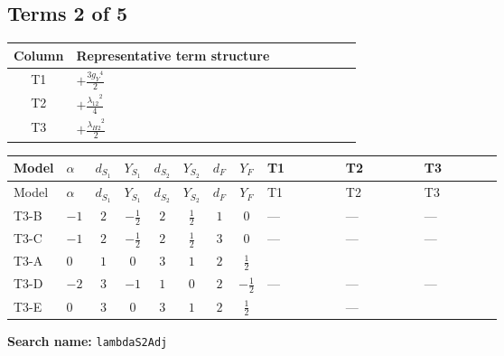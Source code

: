 \documentclass[8pt]{article}
\begin{document}
\begin{landscape}
\subsection*{Terms 2 of 5}
\begin{center}
\begin{tabular}{@{}c >{\raggedright\arraybackslash}p{0.82\linewidth}@{}}
\toprule
Column & Representative term structure \\
\midrule
T1 & \(\displaystyle +\frac{3 {g_Y}^4}{2}\) \\
\midrule
T2 & \(\displaystyle +\frac{{\lambda_{12}}^2}{4}\) \\
\midrule
T3 & \(\displaystyle +\frac{{\lambda_{H2}}^2}{2}\) \\
\midrule
\bottomrule
\end{tabular}
\end{center}
\smallskip
\tiny
\begin{longtable}{@{}llcccccc >{\raggedright\arraybackslash}p{0.21\linewidth} >{\raggedright\arraybackslash}p{0.21\linewidth} >{\raggedright\arraybackslash}p{0.21\linewidth}@{}}
\toprule
Model & $\alpha$ & $d_{S_1}$ & $Y_{S_1}$ & $d_{S_2}$ & $Y_{S_2}$ & $d_F$ & $Y_F$ & T1 & T2 & T3 \\
\midrule
\endfirsthead
\toprule
Model & $\alpha$ & $d_{S_1}$ & $Y_{S_1}$ & $d_{S_2}$ & $Y_{S_2}$ & $d_F$ & $Y_F$ & T1 & T2 & T3 \\
\midrule
\endhead
T3-B & $-1$ & $2$ & $-\frac{1}{2}$ & $2$ & $\frac{1}{2}$ & $1$ & $0$ & --- & --- & --- \\
\midrule
T3-C & $-1$ & $2$ & $-\frac{1}{2}$ & $2$ & $\frac{1}{2}$ & $3$ & $0$ & --- & --- & --- \\
\midrule
T3-A & $0$ & $1$ & $0$ & $3$ & $1$ & $2$ & $\frac{1}{2}$ & \scriptsize\adjustbox{max width=\linewidth}{$\begin{gathered} +\frac{3 {g_Y}^4}{2}\end{gathered}$} & \scriptsize\adjustbox{max width=\linewidth}{$\begin{gathered} +\frac{{\lambda_{12}}^2}{4}\end{gathered}$} & \scriptsize\adjustbox{max width=\linewidth}{$\begin{gathered} +\frac{{\lambda_{H2}}^2}{2}\end{gathered}$} \\
\midrule
T3-D & $-2$ & $3$ & $-1$ & $1$ & $0$ & $2$ & $-\frac{1}{2}$ & --- & --- & --- \\
\midrule
T3-E & $0$ & $3$ & $0$ & $3$ & $1$ & $2$ & $\frac{1}{2}$ & \scriptsize\adjustbox{max width=\linewidth}{$\begin{gathered} +\frac{3 {g_Y}^4}{2}\end{gathered}$} & --- & \scriptsize\adjustbox{max width=\linewidth}{$\begin{gathered} +\frac{{\lambda_{H2}}^2}{2}\end{gathered}$} \\
\midrule
\bottomrule
\end{longtable}
\clearpage
\noindent\textbf{Search name: }\texttt{lambdaS2Adj}\par\smallskip

\end{landscape}
\end{document}
